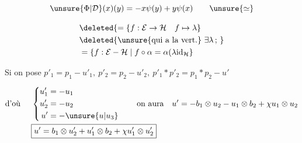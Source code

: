 \[
\unsure{\Phi|\mathcal D}(x)(y)=-x\psi(y)+y\psi(x)\qquad\unsure{\simeq}
\]

\[
\begin{aligned}
&\deleted{=\{f:\mathcal E\to\mathcal H\quad f\mapsto\lambda}\\
&\deleted{\text{\unsure{qui a la vert.}}\ \exists\lambda\,;\,}\\
&=\{f:\mathcal E-\mathcal H\mid f\circ\alpha=\alpha(\lambda\mathrm{id}_{\mathcal H}\}
\end{aligned}
\]


Si on pose $p'_1=p_1-u'_1,\ p'_2=p_2-u'_2,\ p'_1\ast p'_2=p_1\ast p_2-u'$

\[
\begin{aligned}
\text{d'où }\quad&\left\{\begin{aligned}u'_1&=-u_1\\u'_2&=-u_2\\u'&=-\unsure{u|u_3}\end{aligned}\right.
\qquad\text{on aura}\quad u'=-b_1\otimes u_2-u_1\otimes b_2+\chi u_1\otimes u_2\\
&\boxed{u'=b_1\otimes u'_2+u'_1\otimes b_2+\chi u'_1\otimes u'_2}
\end{aligned}
\]


